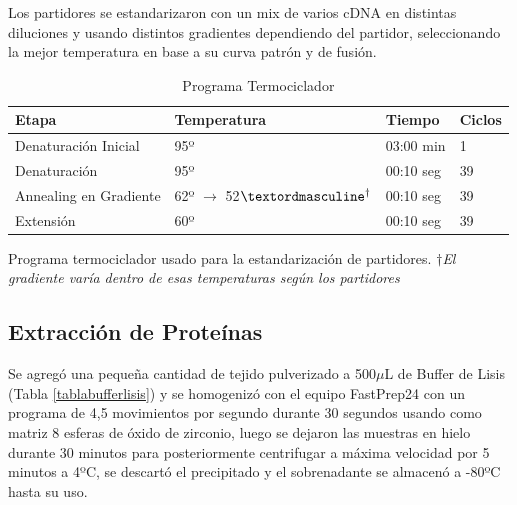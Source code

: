 \documentclass[12pt,a4paper,]{article}
\begin{document}
Los partidores se estandarizaron con un mix de varios cDNA en distintas
diluciones y usando distintos gradientes dependiendo del partidor,
seleccionando la mejor temperatura en base a su curva patrón y de
fusión.

\begin{table}[h!]
\sffamily
  \begin{center}
    \begin{threeparttable}
      \caption{Programa Termociclador}
      \begin{tabularx}{13cm}{l X l l}
    \toprule
    \textbf{Etapa} & \textbf{Temperatura} & \textbf{Tiempo} & \textbf{Ciclos} \\
    \midrule
    Denaturación Inicial & 95º & 03:00 min & 1 \\
    Denaturación & 95º & 00:10 seg & 39\\
    Annealing en Gradiente & 62º $\rightarrow$ 52$º\textsuperscript{$\dagger$}$ & 00:10 seg & 39 \\
    Extensión & 60º & 00:10 seg & 39 \\
\bottomrule
\end{tabularx}
\begin{tablenotes}
  \item Programa termociclador usado para la estandarización de partidores. 
  $\dagger$\emph{El gradiente varía dentro de esas temperaturas según los partidores}
\end{tablenotes}
\end{threeparttable}
\end{center}
\end{table}

\clearpage

\subsection{Extracción de
Proteínas}\label{extracciuxf3n-de-proteuxednas}

Se agregó una pequeña cantidad de tejido pulverizado a 500$\mu$L de
Buffer de Lisis (Tabla \ref{tablabufferlisis}) y se homogenizó con el
equipo FastPrep24 con un programa de 4,5 movimientos por segundo durante
30 segundos usando como matriz 8 esferas de óxido de zirconio, luego se
dejaron las muestras en hielo durante 30 minutos para posteriormente
centrifugar a máxima velocidad por 5 minutos a 4ºC, se descartó el
precipitado y el sobrenadante se almacenó a -80ºC hasta su uso.
\end{document}
